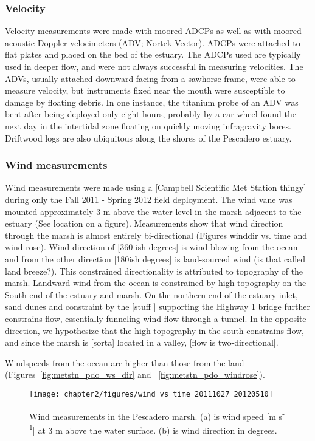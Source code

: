 \subsubsection{Velocity} \label{sssec:velmeas}
Velocity measurements were made with moored ADCPs as well as with moored acoustic Doppler velocimeters (ADV; Nortek Vector). ADCPs were attached to flat plates and placed on the bed of the estuary. The ADCPs used are typically used in deeper flow, and were not always successful in measuring velocities. The ADVs, usually attached downward facing from a sawhorse frame, were able to measure velocity, but instruments fixed near the mouth were susceptible to damage by floating debris. In one instance, the titanium probe of an ADV was bent after being deployed only eight hours, probably by a car wheel found the next day in the intertidal zone floating on quickly moving infragravity bores. Driftwood logs are also ubiquitous along the shores of the Pescadero estuary.  


\subsubsection{Wind measurements} \label{sssec:windmeas}
Wind measurements were made using a [Campbell Scientific Met Station
thingy] during only the Fall 2011 - Spring 2012 field deployment. The wind
vane was mounted approximately 3 m above the water level in the marsh
adjacent to the estuary (See location on a figure).  Measurements show
that wind direction through the marsh is almost entirely bi-directional
(Figures winddir vs. time and wind rose). Wind direction of [360-ish
degrees] is wind blowing from the ocean and from the other direction
[180ish degrees] is land-sourced wind (is that called land breeze?).
This constrained directionality is attributed to topography of the
marsh.  Landward wind from the ocean is constrained by high topography
on the South end of the estuary and marsh. On the northern end of the
estuary inlet, sand dunes and constraint by the [stuff ] supporting the
Highway 1 bridge further constrains flow, essentially funneling wind
flow through a tunnel.  In the opposite direction, we hypothesize that
the high topography in the south constrains flow, and since the marsh is
[sorta] located in a valley, [flow is two-directional].

Windspeeds from the ocean are higher than those from the land (Figures~\ref{fig:metstn_pdo_ws_dir} and~
\ref{fig:metstn_pdo_windrose}).

\begin{figure} \centering
\texttt{[image: chapter2/figures/wind\_vs\_time\_20111027\_20120510]} \caption{Wind 
measurements in the Pescadero marsh. (a) is wind speed [m s\textsuperscript{-1}] at 3
m above the water surface. (b) is wind direction in degrees.}
\label{fig:metstn_pdo_ws_wdir} \end{figure}

